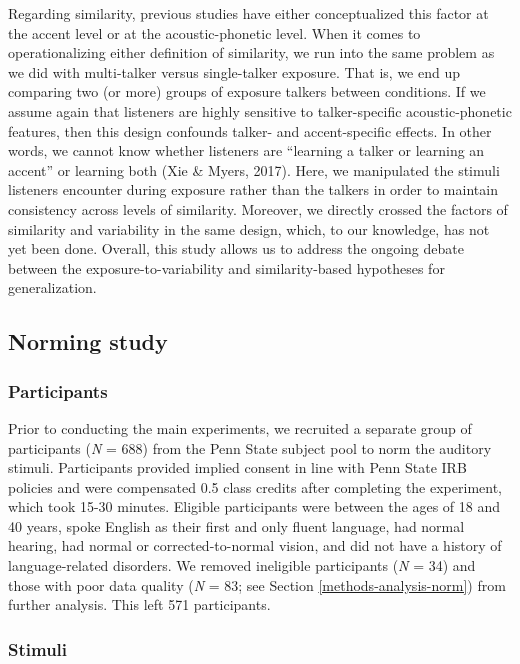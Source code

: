 \documentclass[
  12pt,
  twoside]{article}
\begin{document}
Regarding similarity, previous studies have either conceptualized this factor at the accent level or at the acoustic-phonetic level.
When it comes to operationalizing either definition of similarity, we run into the same problem as we did with multi-talker versus single-talker exposure.
That is, we end up comparing two (or more) groups of exposure talkers between conditions.
If we assume again that listeners are highly sensitive to talker-specific acoustic-phonetic features, then this design confounds talker- and accent-specific effects.
In other words, we cannot know whether listeners are ``learning a talker or learning an accent'' or learning both (Xie \& Myers, 2017).
Here, we manipulated the stimuli listeners encounter during exposure rather than the talkers in order to maintain consistency across levels of similarity.
Moreover, we directly crossed the factors of similarity and variability in the same design, which, to our knowledge, has not yet been done.
Overall, this study allows us to address the ongoing debate between the exposure-to-variability and similarity-based hypotheses for generalization.

\hypertarget{norming-study}{%
\subsection{Norming study}\label{norming-study}}

\hypertarget{methods-pars-norm}{%
\subsubsection{Participants}\label{methods-pars-norm}}

Prior to conducting the main experiments, we recruited a separate group of participants (\emph{N} = 688) from the Penn State subject pool to norm the auditory stimuli.
Participants provided implied consent in line with Penn State IRB policies and were compensated 0.5 class credits after completing the experiment, which took 15-30 minutes.
Eligible participants were between the ages of 18 and 40 years, spoke English as their first and only fluent language, had normal hearing, had normal or corrected-to-normal vision, and did not have a history of language-related disorders.
We removed ineligible participants (\emph{N} = 34) and those with poor data quality (\emph{N} = 83; see Section \ref{methods-analysis-norm}) from further analysis.
This left 571 participants.

\hypertarget{methods-stims}{%
\subsubsection{Stimuli}\label{methods-stims}}
\end{document}
